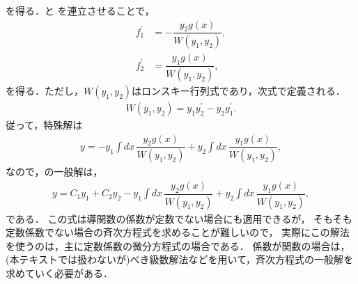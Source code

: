 を得る．と
を連立させることで，
\begin{align}
 f_1^\prime &= -\dfrac{y_2 g(x)}{W(y_1, y_2)}, \\
 f_2^\prime &= \dfrac{y_1 g(x)}{W(y_1, y_2)}, 
\end{align}
を得る．ただし，$W(y_1, y_2)$はロンスキー行列式であり，次式で定義される．
\begin{align}
  W(y_1,y_2) = y_1 y_2^{\prime} - y_2 y_1^{\prime}. 
\end{align}
従って，特殊解は
\begin{align}
 y = -y_1\int dx\,\dfrac{y_2 g(x)}{W(y_1,y_2)} + y_2\int dx\,\dfrac{y_1 g(x)}{W(y_1,y_2)}, \label{pde_sol_with_wronski} 
\end{align}
なので，の一般解は，
\begin{align}
 y = C_1 y_1 + C_2 y_2 -y_1\int dx\,\dfrac{y_2 g(x)}{W(y_1,y_2)} + y_2\int dx\,\dfrac{y_1 g(x)}{W(y_1,y_2)},
\end{align}
である．
この式は導関数の係数が定数でない場合にも適用できるが，
そもそも定数係数でない場合の斉次方程式を求めることが難しいので，
実際にこの解法を使うのは，主に定数係数の微分方程式の場合である．
係数が関数の場合は，(本テキストでは扱わないが)べき級数解法などを用いて，斉次方程式の一般解を求めていく必要がある．
%
